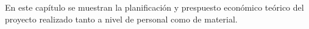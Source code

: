 En este capítulo se muestran la planificación y prespuesto económico teórico del proyecto realizado tanto a nivel de personal como de material.